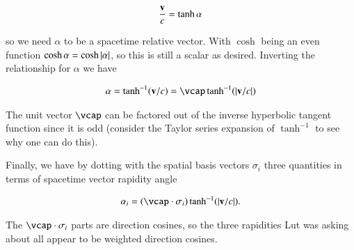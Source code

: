 \begin{align*}
\frac{\mathbf{v}}{c} = \tanh\alpha
\end{align*}

so we need $\alpha$ to be a spacetime relative vector.  With $\cosh$ being an even function $\cosh{\alpha} = \cosh{\left\lvert{\alpha}\right\rvert}$, so this
is still a 
scalar as desired.  Inverting the relationship for $\alpha$ we have

\begin{align*}
\alpha = \tanh^{-1} (\Bv/c) = \vcap \tanh^{-1} (\Abs{\Bv/c})
\end{align*}

The unit vector $\vcap$ can be factored out of the inverse hyperbolic tangent function since it is odd (consider the Taylor series expansion of $\tanh^{-1}$ to see why one can do this).

Finally, we have by 
dotting with the spatial basis vectors $\sigma_i$ three quantities in terms of spacetime vector rapidity angle

\begin{align*}
\alpha_i = (\vcap \cdot \sigma_i) \tanh^{-1} (\Abs{\Bv/c}).
\end{align*}

The $\vcap \cdot \sigma_i$ parts are direction cosines, so the three rapidities Lut was asking about all appear to be weighted direction cosines.

%
%

%
